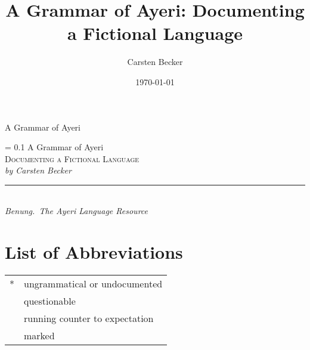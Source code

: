 \documentclass[
	a4paper,
	12pt,
	openany,
	twoside,
	oldfontcommands, %
]{memoir}
\author{Carsten Becker}
\title{A Grammar of Ayeri: Documenting a Fictional Language}
\date{\today}
\newlength\drop
\newcommand*{\titleS}{\begingroup%
\drop = 0.1\textheight
\centering
\vspace*{\drop}
{\Huge A Grammar of Ayeri}\\[\baselineskip]
{\Large\scshape Documenting a Fictional Language}\\[\baselineskip]
{\large\itshape by Carsten Becker}\\[\baselineskip]
\vfill
\rule{0.4\textwidth}{0.4pt}\\[\baselineskip]
{\large\itshape Benung.~The Ayeri Language Resource}\par
\vspace*{\drop}
\endgroup}
\newcommand{\excl}{\fakesuperscript{!}} %
\newcommand{\hash}{\fakesuperscript{\#}} %
\newcommand{\ques}{\fakesuperscript{?}} %
\begin{document}

\begin{titlingpage}
\begin{center}
{\Huge A Grammar of Ayeri}
\end{center}
\end{titlingpage}


\begin{titlingpage}
\titleS
\clearpage

\end{titlingpage}


\frontmatter
\begin{KeepFromToc}
  \tableofcontents
\end{KeepFromToc}
\clearpage
\listoffigures
\clearpage
\listoftables
\chapter{List of Abbreviations}
\begin{multicols}{2}
\printglossary[style=mysuper,type=\leipzigtype]
\end{multicols}
\bigskip

\noindent \begin{tabular}[t]{@{} l l}
*		& ungrammatical or undocumented \\
\ques	& questionable \\
\excl	& running counter to expectation \\
\hash	& marked \\
\end{tabular}

\cleartorecto


\cleartorecto


\mainmatter


\cleartorecto


\cleartorecto


\cleartorecto


\cleartorecto


\cleartorecto
\end{document}
